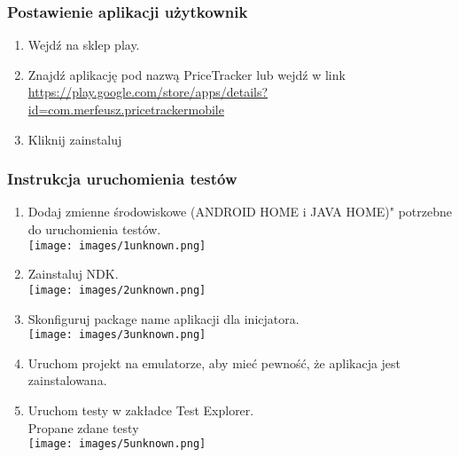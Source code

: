 \documentclass{article}
\begin{document}
        \subsubsection{Postawienie aplikacji użytkownik}
            \begin{enumerate}
            \item  Wejdź na sklep play.\\
            \item Znajdź aplikację pod nazwą PriceTracker lub wejdź w link\\ \href{https://play.google.com/store/apps/details?id=com.merfeusz.pricetrackermobile}{https://play.google.com/store/apps/details?id=com.merfeusz.pricetrackermobile}\\
            \item  Kliknij zainstaluj\\
        \end{enumerate}
      
        \subsubsection{Instrukcja uruchomienia testów}
             \begin{enumerate}
                \item Dodaj zmienne środowiskowe (ANDROID HOME i JAVA HOME)" potrzebne do uruchomienia testów.\\
                    \texttt{[image: images/1unknown.png]}\\
                \item Zainstaluj NDK.\\
                    \texttt{[image: images/2unknown.png]}\\
                \item Skonfiguruj package name aplikacji dla inicjatora.\\
                    \texttt{[image: images/3unknown.png]}\\
                \item Uruchom projekt na emulatorze, aby mieć pewność, że aplikacja jest zainstalowana.\\
                \item Uruchom testy w zakładce Test Explorer.\\
                Propane zdane testy\\
                    \texttt{[image: images/5unknown.png]}\\
        \end{enumerate}
\end{document}
